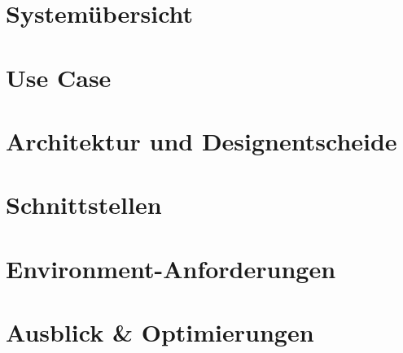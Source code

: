 \documentclass[a4paper, 10pt, fleqn]{article}
\begin{document}


\tableofcontents
\clearpage



\clearpage

\section{Systemübersicht}




\section{Use Case}


\clearpage
\section{Architektur und Designentscheide}


\clearpage
\section{Schnittstellen}

\clearpage
\section{Environment-Anforderungen}

\clearpage
\section{Ausblick \& Optimierungen}

\end{document}
